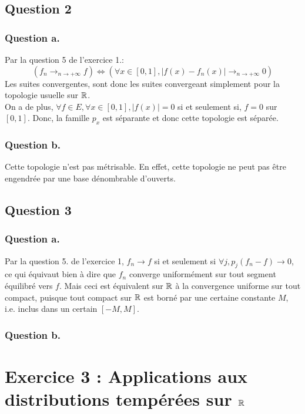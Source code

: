 \documentclass{cours}
\newcommand{\abs}[1]{\left|#1\right|}
\begin{document}
        \subsection{Question 2}
            \subsubsection{Question a.}
                Par la question 5 de l'exercice 1.:
                \[
                    \left(f_{n} \to_{n \to +\infty} f\right) \Leftrightarrow \left(\forall x \in \left[0, 1\right], \abs{f(x)-f_{n} (x)} \to_{n\to +\infty} 0\right)
                \]
                Les suites convergentes, sont donc les suites convergeant simplement pour la topologie usuelle sur $\mathbb{R}$.\\
                On a de plus, $\forall f \in E, \forall x \in \left[0, 1\right], \abs{f(x)} = 0$ si et seulement si, $f = 0$ sur $\left[0, 1\right]$. Donc, la famille $p_{x}$ est séparante et donc cette topologie est séparée. 

            \subsubsection{Question b.}
                Cette topologie n'est pas métrisable. En effet, cette topologie ne peut pas être engendrée par une base dénombrable d'ouverts.
        
        \subsection{Question 3}
            \subsubsection{Question a.}
                Par la question 5. de l'exercice 1, $f_{n} \to f$ si et seulement si $\forall j, p_{j}(f_{n} - f) \to 0$, ce qui équivaut bien à dire que $f_{n}$ converge uniformément sur tout segment équilibré vers $f$. Mais ceci est équivalent sur $\mathbb{R}$ à la convergence uniforme sur tout compact, puisque tout compact sur $\mathbb{R}$ est borné par une certaine constante $M$, i.e. inclus dans un certain $\left[-M, M\right]$.

            \subsubsection{Question b.}
                
    \section{Exercice 3 : Applications aux distributions tempérées sur $\mathbb{R}$}
\end{document}
